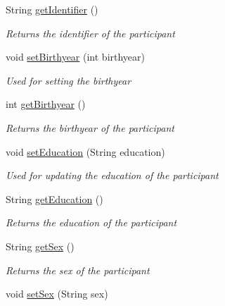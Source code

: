 \begin{DoxyCompactItemize}
String \hyperlink{class_web_analyzer_1_1_u_i_1_1_interaction_objects_1_1_participant_control_a6c34cb14cd2906b04e14781cb323c09a}{get\+Identifier} ()
\begin{DoxyCompactList}\small\item\em Returns the identifier of the participant \end{DoxyCompactList}\item 
void \hyperlink{class_web_analyzer_1_1_u_i_1_1_interaction_objects_1_1_participant_control_a7ee9d12140bd3267295398c59341c332}{set\+Birthyear} (int birthyear)
\begin{DoxyCompactList}\small\item\em Used for setting the birthyear \end{DoxyCompactList}\item 
int \hyperlink{class_web_analyzer_1_1_u_i_1_1_interaction_objects_1_1_participant_control_abb724cd0dd15e40e4b5df261eb04a8a5}{get\+Birthyear} ()
\begin{DoxyCompactList}\small\item\em Returns the birthyear of the participant \end{DoxyCompactList}\item 
void \hyperlink{class_web_analyzer_1_1_u_i_1_1_interaction_objects_1_1_participant_control_a155f2c7193f63292b9db9cba519a6b91}{set\+Education} (String education)
\begin{DoxyCompactList}\small\item\em Used for updating the education of the participant \end{DoxyCompactList}\item 
String \hyperlink{class_web_analyzer_1_1_u_i_1_1_interaction_objects_1_1_participant_control_a9e0ff1066116a72e21146a8132c5c6f2}{get\+Education} ()
\begin{DoxyCompactList}\small\item\em Returns the education of the participant \end{DoxyCompactList}\item 
String \hyperlink{class_web_analyzer_1_1_u_i_1_1_interaction_objects_1_1_participant_control_aa6fff7010ab96f3305ef55da8697c636}{get\+Sex} ()
\begin{DoxyCompactList}\small\item\em Returns the sex of the participant \end{DoxyCompactList}\item 
void \hyperlink{class_web_analyzer_1_1_u_i_1_1_interaction_objects_1_1_participant_control_a889ab843cc8afc4fb322c167f255baa8}{set\+Sex} (String sex)

\end{DoxyCompactItemize}
